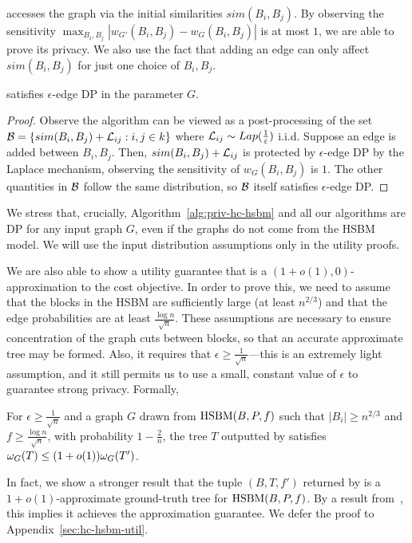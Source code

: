 \dphcblocks{} accesses the graph via the initial similarities $sim(B_i, B_j)$. By observing the sensitivity $\max_{B_i, B_j} |w_{G'}(B_i, B_j) - w_G(B_i, B_j)|$ is at most $1$, we are able to prove its privacy. We also use the fact that adding an edge can only affect $sim(B_i, B_j)$ for just one choice of $B_i, B_j$.
\begin{thm}
\dphcblocks{} satisfies $\epsilon$-edge DP in the parameter $G$.
\end{thm}
\begin{proof}
Observe the algorithm can be viewed as a post-processing of the set $\mathcal{B} = \{sim(B_i, B_j) + \mathcal{L}_{ij} : i,j \in k\}$ where $\mathcal{L}_{ij} \sim Lap(\frac{1}{\varepsilon})$ i.i.d. Suppose an edge is added between $B_{i}, B_{j}$. Then, $sim(B_{i}, B_{j}) + \mathcal{L}_{ij}$ is protected by $\epsilon$-edge DP by the Laplace mechanism, observing the sensitivity of $w_G(B_{i}, B_{j})$ is $1$. The other quantities in $\mathcal{B}$ follow the same distribution, so $\mathcal{B}$ itself satisfies $\epsilon$-edge DP.
\end{proof}
We stress that, crucially,
Algorithm~\ref{alg:priv-hc-hsbm} and all our algorithms are DP for any input graph $G$, even if the graphs do not come from the HSBM model. We will use the input distribution assumptions only in the utility proofs.

We are also able to show a utility guarantee that \dphcblocks{} is a $(1+o(1), 0)$-approximation to the cost objective. In order to prove this, we need to assume that the blocks in the HSBM are sufficiently large (at least $n^{2/3}$) and that the edge probabilities are at least $\frac{\log n}{\sqrt{n}}$. These assumptions are necessary to ensure concentration of the graph cuts between blocks, so that an accurate approximate tree may be formed. Also, it requires that $\epsilon \geq \frac{1}{\sqrt{n}}$---this is an extremely light assumption, and it still permits us to use a small, constant value of $\epsilon$ to guarantee strong privacy. Formally,

\begin{thm}\label{thm:hc-hsbm-util}
For $\epsilon \geq \frac{1}{\sqrt{n}}$ and a graph $G$ drawn from $\textnormal{HSBM}(B, P, f)$ such that $|B_i| \geq n^{2/3}$ and $f \geq \frac{\log n}{\sqrt{n}}$, with probability $1-\frac{2}{n}$, the tree $T$ outputted by \dphcblocks{} satisfies
$\omega_G(T) \leq (1 + o(1)) \omega_G(T')$.
\end{thm}
In fact, we show a stronger result that the tuple $(B,T,f')$ returned by \dphcblocks{} is a $1+o(1)$-approximate ground-truth tree for $\textnormal{HSBM}(B,P,f)$. By a result from~\citet{cohen2019hierarchical}, this implies it achieves the approximation guarantee. We defer the proof to Appendix~\ref{sec:hc-hsbm-util}.

